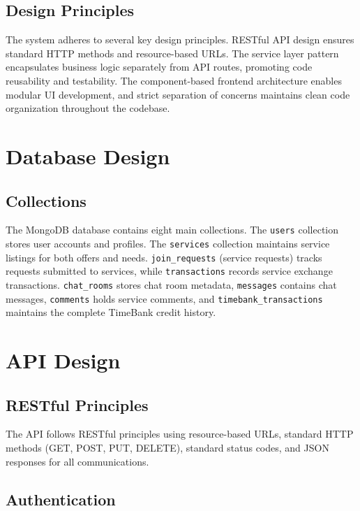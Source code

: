 \documentclass[12pt,a4paper]{report}
\begin{document}
\subsection{Design Principles}

The system adheres to several key design principles. RESTful API design ensures standard HTTP methods and resource-based URLs. The service layer pattern encapsulates business logic separately from API routes, promoting code reusability and testability. The component-based frontend architecture enables modular UI development, and strict separation of concerns maintains clean code organization throughout the codebase.

\section{Database Design}

\subsection{Collections}

The MongoDB database contains eight main collections. The \texttt{users} collection stores user accounts and profiles. The \texttt{services} collection maintains service listings for both offers and needs. \texttt{join\_requests} (service requests) tracks requests submitted to services, while \texttt{transactions} records service exchange transactions. \texttt{chat\_rooms} stores chat room metadata, \texttt{messages} contains chat messages, \texttt{comments} holds service comments, and \texttt{timebank\_transactions} maintains the complete TimeBank credit history.

\section{API Design}

\subsection{RESTful Principles}

The API follows RESTful principles using resource-based URLs, standard HTTP methods (GET, POST, PUT, DELETE), standard status codes, and JSON responses for all communications.

\subsection{Authentication}
\end{document}
